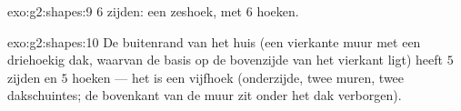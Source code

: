 \begin{solution}{exo:g2:shapes:9}
$6$ zijden: een zeshoek, met $6$ hoeken.
\end{solution}

\begin{solution}{exo:g2:shapes:10}
De buitenrand van het huis (een vierkante muur met een driehoekig dak,
waarvan de basis op de bovenzijde van het vierkant ligt) heeft $5$ zijden
en $5$ hoeken --- het is een vijfhoek (onderzijde, twee muren, twee
dakschuintes; de bovenkant van de muur zit onder het dak verborgen).
\end{solution}
